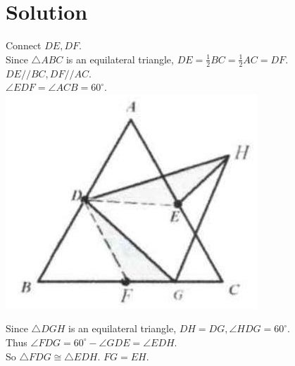 \documentclass{article}
\begin{document}
\section*{Solution}
Connect \(D E, D F\).\\
Since \(\triangle A B C\) is an equilateral triangle, \(D E=\frac{1}{2} B C=\frac{1}{2} A C=D F\).\\
\(D E / / B C, D F / / A C\).\\
\(\angle E D F=\angle A C B=60^{\circ}\).\\
\centering
\includegraphics[width=\textwidth]{images/reasoning_image_1.jpg}

Since \(\triangle D G H\) is an equilateral triangle, \(D H=D G, \angle H D G=60^{\circ}\).\\
Thus \(\angle F D G=60^{\circ}-\angle G D E=\angle E D H\).\\
So \(\triangle F D G \cong \triangle E D H\). \(F G=E H\).
\end{document}

